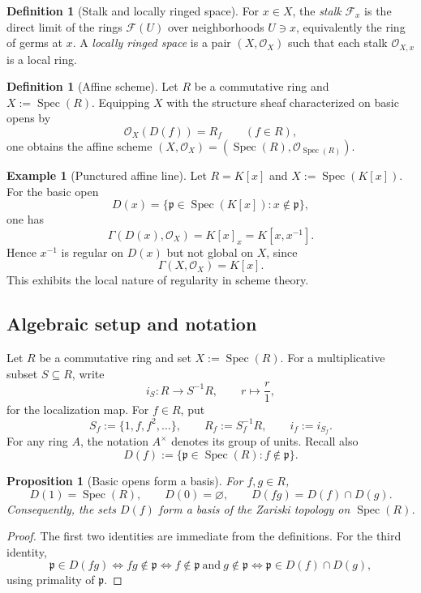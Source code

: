 \documentclass[12pt, a4paper]{article}
\newtheorem{proposition}[theorem]{Proposition}
\theoremstyle{definition}
\newtheorem{definition}[theorem]{Definition}
\newtheorem{example}[theorem]{Example}
\DeclareMathOperator{\Spec}{Spec}
\newcommand{\OO}{\mathcal{O}}
\begin{document}
\begin{definition}[Stalk and locally ringed space]
For $x\in X$, the \emph{stalk} $\mathcal F_x$ is the direct limit of the rings $\mathcal F(U)$ over neighborhoods $U\ni x$, equivalently the ring of germs at $x$. A \emph{locally ringed space} is a pair $(X,\OO_X)$ such that each stalk $\OO_{X,x}$ is a local ring.
\end{definition}

\begin{definition}[Affine scheme]
Let $R$ be a commutative ring and $X:=\Spec(R)$. Equipping $X$ with the structure sheaf characterized on basic opens by
\[
\OO_X(D(f))=R_f
\qquad (f\in R),
\]
one obtains the affine scheme $(X,\OO_X)=(\Spec(R),\OO_{\Spec(R)})$.
\end{definition}

\begin{example}[Punctured affine line]
Let $R=K[x]$ and $X:=\Spec(K[x])$. For the basic open
\[
D(x)=\{\mathfrak p\in\Spec(K[x]) : x\notin\mathfrak p\},
\]
one has
\[
\Gamma(D(x),\OO_X)=K[x]_x=K[x,x^{-1}].
\]
Hence $x^{-1}$ is regular on $D(x)$ but not global on $X$, since
\[
\Gamma(X,\OO_X)=K[x].
\]
This exhibits the local nature of regularity in scheme theory.
\end{example}

\subsection{Algebraic setup and notation}

Let $R$ be a commutative ring and set $X:=\Spec(R)$. For a multiplicative subset $S\subseteq R$, write
\[
i_S:R\to S^{-1}R,
\qquad
r\longmapsto \frac{r}{1},
\]
for the localization map. For $f\in R$, put
\[
S_f:=\{1,f,f^2,\dots\},
\qquad
R_f:=S_f^{-1}R,
\qquad
i_f:=i_{S_f}.
\]
For any ring $A$, the notation $A^\times$ denotes its group of units. Recall also
\[
D(f):=\{\mathfrak p\in\Spec(R): f\notin\mathfrak p\}.
\]

\begin{proposition}[Basic opens form a basis]
For $f,g\in R$,
\[
D(1)=\Spec(R),
\qquad
D(0)=\varnothing,
\qquad
D(fg)=D(f)\cap D(g).
\]
Consequently, the sets $D(f)$ form a basis of the Zariski topology on $\Spec(R)$.
\end{proposition}

\begin{proof}
The first two identities are immediate from the definitions. For the third identity,
\[
\mathfrak p\in D(fg)
\iff
fg\notin\mathfrak p
\iff
f\notin\mathfrak p\ \text{and}\ g\notin\mathfrak p
\iff
\mathfrak p\in D(f)\cap D(g),
\]
using primality of $\mathfrak p$.
\end{proof}
\end{document}
